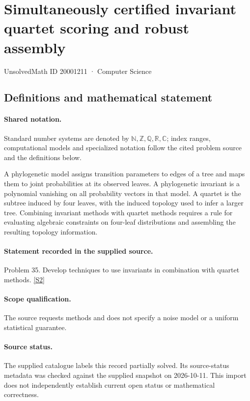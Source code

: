 \documentclass[11pt]{article}
\newcommand{\sref}[2]{\hyperlink{source:#1:#2}{[S#2]}}
\begin{document}
\setcounter{section}{20001210}
\section{Simultaneously certified invariant quartet scoring and robust assembly}\label{20001211}
{\small\sffamily UnsolvedMath ID 20001211 · Computer Science}
\subsection{Definitions and mathematical statement}

\paragraph{Shared notation.}Standard number systems are denoted by $\mathbb N,\mathbb Z,\mathbb Q,\mathbb R,\mathbb C$; index ranges, computational models and specialized notation follow the cited problem source and the definitions below.


A phylogenetic model assigns transition parameters to edges of a tree and maps them to joint probabilities at its observed leaves. A phylogenetic invariant is a polynomial vanishing on all probability vectors in that model. A quartet is the subtree induced by four leaves, with the induced topology used to infer a larger tree. Combining invariant methods with quartet methods requires a rule for evaluating algebraic constraints on four-leaf distributions and assembling the resulting topology information.
\paragraph{Statement recorded in the supplied source.}
Problem 35. Develop techniques to use invariants in combination with quartet methods. \sref{20001211}{2}
\paragraph{Scope qualification.}
The source requests methods and does not specify a noise model or a uniform statistical guarantee.
\paragraph{Source status.}
The supplied catalogue labels this record partially solved. Its source-status metadata was checked against the supplied snapshot on 2026-10-11. This import does not independently establish current open status or mathematical correctness.
\end{document}
